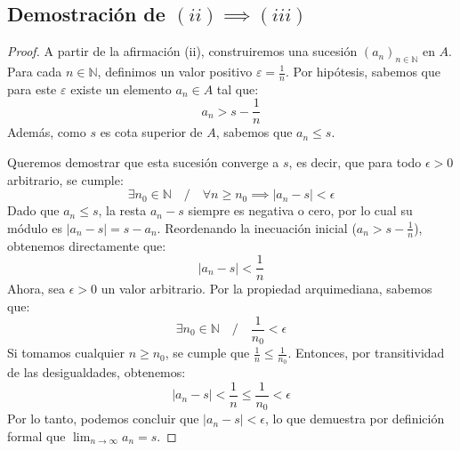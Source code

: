 \documentclass[11pt, a4paper]{article}
\newcommand{\N}{\mathbb{N}}
\newcommand{\eps}{\varepsilon}
\begin{document}
	\subsection*{Demostración de $(ii) \implies (iii)$}
	\begin{proof}
		A partir de la afirmación (ii), construiremos una sucesión $(a_n)_{n \in \N}$ en $A$. Para cada $n \in \N$, definimos un valor positivo $\eps = \frac{1}{n}$. Por hipótesis, sabemos que para este $\eps$ existe un elemento $a_n \in A$ tal que:
		\[
		a_n > s - \frac{1}{n}
		\]
		Además, como $s$ es cota superior de $A$, sabemos que $a_n \leq s$.
		
		Queremos demostrar que esta sucesión converge a $s$, es decir, que para todo $\epsilon > 0$ arbitrario, se cumple:
		\[
		\exists n_0 \in \N \quad / \quad \forall n \geq n_0 \implies |a_n - s| < \epsilon
		\]
		Dado que $a_n \leq s$, la resta $a_n - s$ siempre es negativa o cero, por lo cual su módulo es $|a_n - s| = s - a_n$. Reordenando la inecuación inicial ($a_n > s - \frac{1}{n}$), obtenemos directamente que:
		\[
		|a_n - s| < \frac{1}{n}
		\]
		Ahora, sea $\epsilon > 0$ un valor arbitrario. Por la propiedad arquimediana, sabemos que:
		\[
		\exists n_0 \in \N \quad / \quad \frac{1}{n_0} < \epsilon
		\]
		Si tomamos cualquier $n \geq n_0$, se cumple que $\frac{1}{n} \leq \frac{1}{n_0}$. Entonces, por transitividad de las desigualdades, obtenemos:
		\[
		|a_n - s| < \frac{1}{n} \leq \frac{1}{n_0} < \epsilon
		\]
		Por lo tanto, podemos concluir que $|a_n - s| < \epsilon$, lo que demuestra por definición formal que $\lim_{n \to \infty} a_n = s$.
	\end{proof}
	
	\vspace{0.5cm}
	
\end{document}
